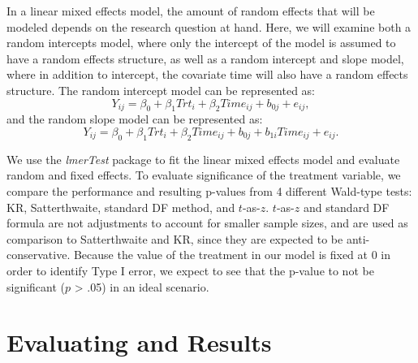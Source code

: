 \documentclass[12pt, twoside]{amherstthesis}
\begin{document}
In a linear mixed effects model, the amount of random effects that will be modeled depends on the research question at hand. Here, we will examine both a random intercepts model, where only the intercept of the model is assumed to have a random effects structure, as well as a random intercept and slope model, where in addition to intercept, the covariate time will also have a random effects structure. The random intercept model can be represented as: \[Y_{ij} = \beta_0 + \beta_1Trt_i + \beta_2Time_{ij} + b_{0j} + e_{ij},\] and the random slope model can be represented as: \[Y_{ij} = \beta_0 + \beta_1Trt_i + \beta_2Time_{ij} + b_{0j} + b_{1i}Time_{ij} + e_{ij}.\]

We use the \emph{lmerTest} package to fit the linear mixed effects model and evaluate random and fixed effects. To evaluate significance of the treatment variable, we compare the performance and resulting p-values from 4 different Wald-type tests: KR, Satterthwaite, standard DF method, and \(t\)-as-\(z\). \(t\)-as-\(z\) and standard DF formula are not adjustments to account for smaller sample sizes, and are used as comparison to Satterthwaite and KR, since they are expected to be anti-conservative. Because the value of the treatment in our model is fixed at 0 in order to identify Type I error, we expect to see that the p-value to not be significant (\(p\) \textgreater{} .05) in an ideal scenario.

\hypertarget{evaluating-and-results}{%
\section{Evaluating and Results}\label{evaluating-and-results}}
\end{document}
